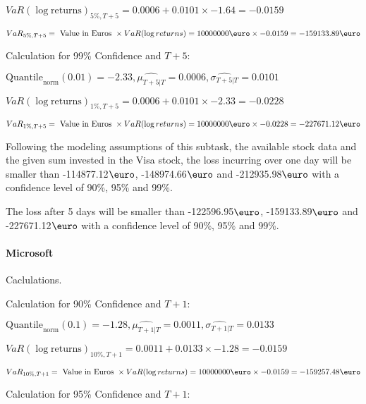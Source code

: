 \indent\indent $VaR(\log \text{returns})_{5\%, T + 5} = 0.0006 + 0.0101\times-1.64 = -0.0159$

\indent\indent $VaR_{5\%, T + 5} = \text{ Value in Euros } \times VaR(\log returns) = 10 000 000 \text{\euro} \times-0.0159 = -159133.89 \text{\euro}$\newline




Calculation for 99\% Confidence and $T+5$:

\indent\indent $\text{Quantile}_\text{norm}(0.01) = -2.33,\hat{\mu_{T+5|T}} = 0.0006, \hat{\sigma_{T+5|T}} = 0.0101$

\indent\indent $VaR(\log \text{returns})_{1\%, T + 5} = 0.0006 + 0.0101\times-2.33 = -0.0228$

\indent\indent $VaR_{1\%, T + 5} = \text{ Value in Euros } \times VaR(\log returns) = 10 000 000 \text{\euro} \times-0.0228 = -227671.12 \text{\euro}$\newline


Following the modeling assumptions of this subtask, the available stock data and the given sum invested in the Visa stock, the loss incurring over one day will be smaller than -114877.12$\text{\euro}$, -148974.66$\text{\euro}$  and -212935.98$\text{\euro}$  with a confidence level of 90\%, 95\%  and 99\%.

The loss after 5 days will be smaller than -122596.95$\text{\euro}$, -159133.89$\text{\euro}$  and -227671.12$\text{\euro}$  with a confidence level of 90\%, 95\%  and 99\%.


\paragraph{Microsoft} Caclulations.\newline \indent 




Calculation for 90\% Confidence and $T+1$:

\indent\indent $\text{Quantile}_\text{norm}(0.1) = -1.28,\hat{\mu_{T+1|T}} = 0.0011, \hat{\sigma_{T+1|T}} = 0.0133$

\indent\indent $VaR(\log \text{returns})_{10\%, T + 1} = 0.0011 + 0.0133\times-1.28 = -0.0159$

\indent\indent $VaR_{10\%, T + 1} = \text{ Value in Euros } \times VaR(\log returns) = 10 000 000 \text{\euro} \times-0.0159 = -159257.48 \text{\euro}$\newline




Calculation for 95\% Confidence and $T+1$:


